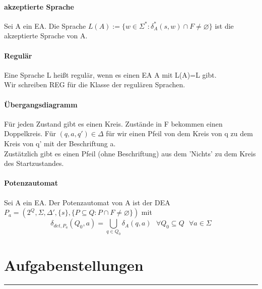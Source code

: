\documentclass[DIV=15]{scrartcl}
\begin{document}
    \subsection{akzeptierte Sprache}
        Sei A ein EA. Die Sprache \(L(A):=\{w\in\Sigma^*:\delta_A^*(s,w)\cap F\neq\varnothing\}\) ist die akzeptierte Sprache von A. 
    \subsection{Regulär}
        Eine Sprache L heißt regulär, wenn es einen EA A mit L(A)=L gibt.\\
        Wir schreiben REG für die Klasse der regulären Sprachen.
    \subsection{Übergangsdiagramm}
        Für jeden Zustand gibt es einen Kreis. Zustände in F bekommen einen Doppelkreis. Für \((q,a,q')\in\Delta\) für wir 
        einen Pfeil von dem Kreis von q zu dem Kreis von q' mit der Beschriftung a.\\
        Zustätzlich gibt es einen Pfeil (ohne Beschriftung) aus dem 'Nichts' zu dem Kreis des Startzustandes.
    \subsection{Potenzautomat}
        Sei A ein EA. Der Potenzautomat von A ist der DEA \(P_a=(2^Q, \Sigma, \Delta',\{s\},\{P\subseteq Q:P\cap F\neq\varnothing\})\) mit
        \[\delta_{det,P_a}(Q_0,a)=\bigcup\limits_{q\in Q_0}\delta_A(q,a)\text{ }\forall Q_0\subseteq Q\text{ }\forall a\in\Sigma\]
\newpage
\part{Aufgabenstellungen}
\rule{467.1pt}{0.4pt}
\end{document}
